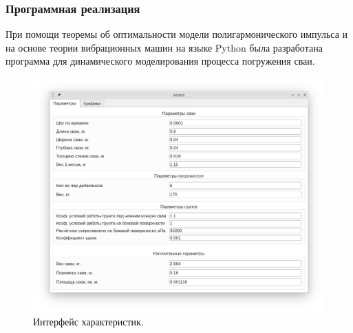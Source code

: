 \documentclass[10pt, pdf, hyperref={unicode}]{beamer}
\begin{document}
    \begin{frame}
        \frametitle{Программная реализация}
        \begin{center}
            \begin{minipage}[h]{0.97\linewidth}
                При помощи теоремы об оптимальности модели полигармонического импульса и на основе теории вибрационных машин
                на языке Python была разработана программа для динамического моделирования процесса погружения сваи.
                \newline
                \begin{minipage}[h]{0.49\linewidth}
                    \begin{figure}[h]
                        \centering
                        \includegraphics[width=1\linewidth]{../img/xolm_3_linux_params.png}
                        \caption{Интерфейс характеристик.}
                    \end{figure}
                \end{minipage}
                \hfill
                \begin{minipage}[h]{0.49\linewidth}
                    \begin{figure}[h]
                        \centering

\end{figure}
\end{minipage}
\end{minipage}
\end{center}
\end{frame}
\end{document}
